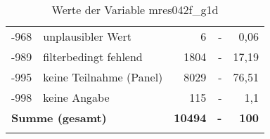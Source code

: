 \begin{longtable}{Xlrrr}
       -968 & unplausibler Wert & 6 & - & 0,06 \\

       -989 & filterbedingt fehlend & 1804 & - & 17,19 \\

       -995 & keine Teilnahme (Panel) & 8029 & - & 76,51 \\

       -998 & keine Angabe & 115 & - & 1,1 \\

     \midrule
     \multicolumn{2}{l}{\textbf{Summe (gesamt)}} & \textbf{10494} & \textbf{-} & \textbf{100} \\
     \bottomrule
     \caption{Werte der Variable mres042f\_g1d}
     \end{longtable}
     
